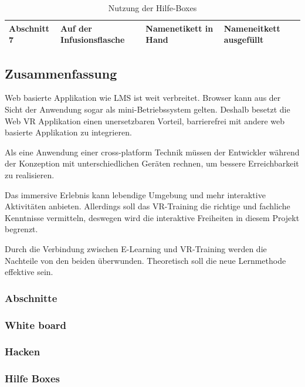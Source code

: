 \begin{table}[]
{\begin{tabular}{llll}
Abschnitt 7 & Auf der Infusionsflasche                                                         & Namenetikett in Hand                                                                                     & Nameneitkett ausgefüllt                                                                                  \\ \hline
\end{tabular}%
}
\caption{Nutzung der Hilfe-Boxes}
\label{my-label}
\end{table}

  
\subsection{Zusammenfassung}
Web basierte Applikation wie LMS ist weit verbreitet. Browser kann aus der Sicht der Anwendung sogar als mini-Betriebssystem gelten. Deshalb besetzt die Web VR Applikation einen unersetzbaren Vorteil, barrierefrei mit andere web basierte Applikation zu integrieren.

Als eine Anwendung einer cross-platform Technik müssen der Entwickler während der Konzeption mit unterschiedlichen Geräten rechnen, um bessere Erreichbarkeit zu realisieren.

Das immersive Erlebnis kann lebendige Umgebung und mehr interaktive Aktivitäten anbieten. Allerdings soll das VR-Training die richtige und fachliche Kenntnisse vermitteln, deswegen wird die interaktive Freiheiten in diesem Projekt begrenzt.

Durch die Verbindung zwischen E-Learning und VR-Training werden die Nachteile von den beiden überwunden. Theoretisch soll die neue Lernmethode effektive sein.
  
  \subsubsection{Abschnitte}
  
  \subsubsection{White board}
  
  \subsubsection{Hacken}
  
  \subsubsection{Hilfe Boxes}
  

